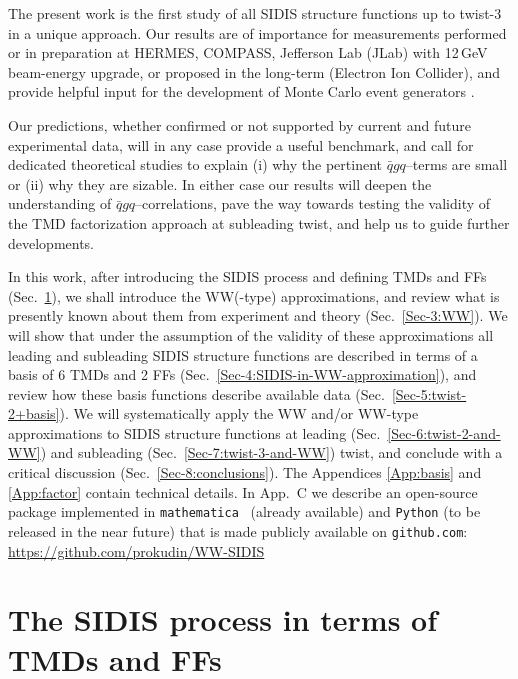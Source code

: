 \documentclass[a4paper,11pt]{article}
\begin{document}
The present work is the first study of all SIDIS structure functions up to 
twist-3 in a unique approach. Our results are of importance for measurements 
performed or in preparation at HERMES, COMPASS, Jefferson Lab (JLab) with 
12$\,$GeV beam-energy upgrade, or proposed in the long-term 
(Electron Ion Collider), and provide helpful input for the 
development of Monte Carlo event generators \cite{Avakian:2015vha}.

Our predictions, whether confirmed or not supported by current and 
future experimental data, will in any case provide a useful benchmark,
and call for dedicated theoretical studies to explain (i) why the 
pertinent $\bar{q}gq$--terms are small or (ii) why they are sizable. 
In either case our results will deepen the understanding of 
$\bar{q}gq$--correlations, pave the 
way towards testing the validity of the TMD factorization approach 
at subleading twist, and help us to guide further developments.

In this work, after introducing the SIDIS process and defining TMDs and 
FFs (Sec.~\ref{Sec-2:SIDIS+TMDs+FF}), we shall introduce the WW(-type) 
approximations, and review what is presently known about them 
from experiment and theory (Sec.~\ref{Sec-3:WW}).
We will show that under the assumption of the validity of these approximations 
all leading and subleading SIDIS structure functions are described in terms of 
a basis of 6 TMDs and 2 FFs (Sec.~\ref{Sec-4:SIDIS-in-WW-approximation}),
and review how these basis functions describe available data 
(Sec.~\ref{Sec-5:twist-2+basis}).
We will systematically apply the WW and/or WW-type approximations
to SIDIS structure functions at leading (Sec.~\ref{Sec-6:twist-2-and-WW}) 
and subleading (Sec.~\ref{Sec-7:twist-3-and-WW}) twist, and
conclude with a critical discussion (Sec.~\ref{Sec-8:conclusions}).
The Appendices \ref{App:basis} and \ref{App:factor} contain 
technical details. 
	In App.~C we describe an open-source package implemented 
	in \texttt{mathematica}~\cite{Mathematica} (already available) 
	and \texttt{Python} (to be released in the near future) that is 
	made publicly available on \texttt{github.com}: {\href{
	https://github.com/prokudin/WW-SIDIS}{
	https://github.com/prokudin/WW-SIDIS}} 





\section{The SIDIS process in terms of TMDs and FFs}
\label{Sec-2:SIDIS+TMDs+FF}
\end{document}
